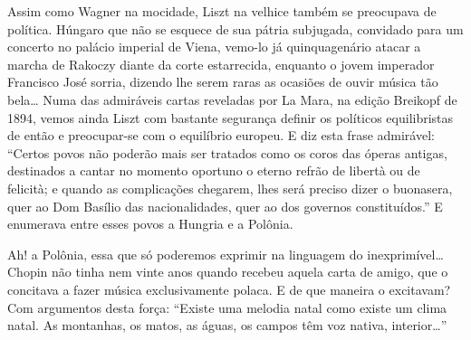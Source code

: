 Assim como Wagner na mocidade, Liszt na velhice também se preocupava de
política. Húngaro que não se esquece de sua pátria subjugada, convidado
para um concerto no palácio imperial de Viena, vemo-lo já quinquagenário
atacar a marcha de Rakoczy diante da corte estarrecida, enquanto o jovem
imperador Francisco José sorria, dizendo lhe serem raras as ocasiões de
ouvir música tão bela\ldots{} Numa das admiráveis cartas reveladas por La
Mara, na edição Breikopf de 1894, vemos ainda Liszt com bastante
segurança definir os políticos equilibristas de então e preocupar-se com
o equilíbrio europeu. E diz esta frase admirável: ``Certos povos não
poderão mais ser tratados como os coros das óperas antigas, destinados a
cantar no momento oportuno o eterno refrão de libertà ou de felicità; e
quando as complicações chegarem, lhes será preciso dizer o buonasera,
quer ao Dom Basílio das nacionalidades, quer ao dos governos
constituídos.'' E enumerava entre esses povos a Hungria e a Polônia.

Ah! a Polônia, essa que só poderemos exprimir na linguagem do
inexprimível\ldots{} Chopin não tinha nem vinte anos quando recebeu aquela
carta de amigo, que o concitava a fazer música exclusivamente polaca. E
de que maneira o excitavam? Com argumentos desta força: ``Existe uma
melodia natal como existe um clima natal. As montanhas, os matos, as
águas, os campos têm voz nativa, interior\ldots{}''

